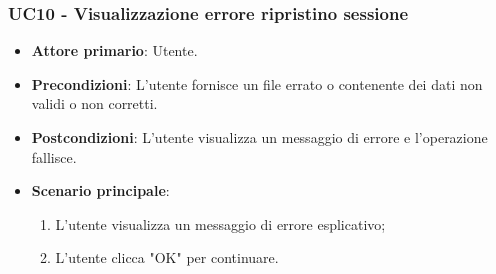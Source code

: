 \subsubsection{UC10 - Visualizzazione errore ripristino sessione}
\begin{itemize}
	\item \textbf{Attore primario}: Utente.
	\item \textbf{Precondizioni}: L'utente fornisce un file errato o contenente dei dati non validi o non corretti.
	\item \textbf{Postcondizioni}: L'utente visualizza un messaggio di errore e l'operazione fallisce.
	\item \textbf{Scenario principale}:
		\begin{enumerate}
			\item L'utente visualizza un messaggio di errore esplicativo;
			\item L'utente clicca "OK" per continuare.
		\end{enumerate}
\end{itemize}